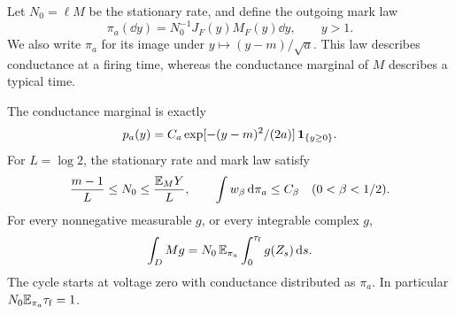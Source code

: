 Let $N_0=\ell M$ be the stationary rate, and define the outgoing mark law
\begin{equation}\label{eq:mark-law}
 \pi_a(\dd y)=N_0^{-1}J_F(y)M_F(y)\dd y,\qquad y>1.
\end{equation}
We also write $\pi_a$ for its image under $y\mapsto(y-m)/\sqrt a$.
This law describes conductance at a firing time, whereas the conductance
marginal of $M$ describes a typical time.

\begin{lemma}\label{lem:occupation}
The conductance marginal is exactly
\begin{equation}\label{eq:Gaussian-marginal}
 p_a(y)=C_a\exp[-(y-m)^2/(2a)]\,\mathbf 1_{\{y\ge0\}}.
\end{equation}
For $L=\log2$, the stationary rate and mark law satisfy
\begin{equation}\label{eq:rate-mark-bounds}
 \frac{m-1}{L}\le N_0\le\frac{\mathbb E_M Y}{L},\qquad
 \int w_\beta\,\mathrm d\pi_a\le C_\beta\quad(0<\beta<1/2).
\end{equation}
For every nonnegative measurable $g$, or every integrable complex $g$,
\begin{equation}\label{eq:occupation}
 \int_D Mg=N_0\,\mathbb E_{\pi_a}\int_0^{\tau_{\mathrm f}} g(Z_s)\,\mathrm d s.
\end{equation}
The cycle starts at voltage zero with conductance distributed as $\pi_a$.
In particular $N_0\mathbb E_{\pi_a}{\tau_{\mathrm f}}=1$.
\end{lemma}

